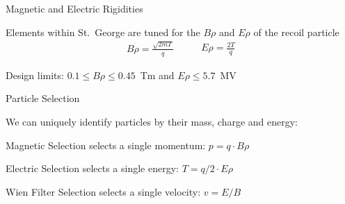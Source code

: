 \documentclass[10pt]{beamer}
\begin{document}
\begin{frame}[fragile]{Magnetic and Electric Rigidities}

    Elements within St.\ George are tuned for the $B\rho$ and $E\rho$ of
    the recoil particle
    \[
        \begin{split}
            B\rho = \frac{\sqrt{2mT}}{q}
        \end{split}
        \quad\quad
        \begin{split}
            E\rho = \frac{2T}{q}
        \end{split}
    \]

    Design limits: $0.1 \leq B\rho \leq 0.45$~Tm and $E\rho \leq 5.7$~MV

\end{frame}

\begin{frame}[fragile]{Particle Selection}

    We can uniquely identify particles by their mass, charge and energy:

    \begin{alertblock}{Magnetic Selection}
        selects a single momentum: $p = q \cdot B\rho$
    \end{alertblock}
    \begin{alertblock}{Electric Selection}
        selects a single energy: $T = q/2 \cdot E\rho$
    \end{alertblock}
    \begin{alertblock}{Wien Filter Selection}
        selects a single velocity: $v = E/B$
    \end{alertblock}


\end{frame}
\end{document}
